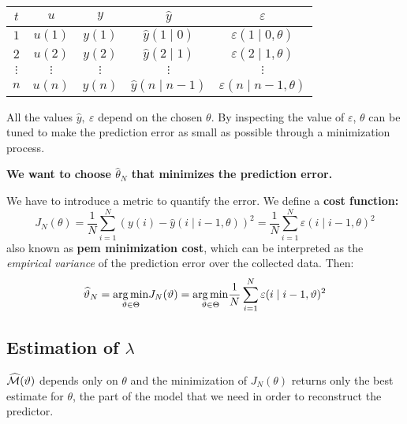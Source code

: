 \begin{center}

\begin{tabular}{ccccc}
\toprule 
 $t$ & $u$ & $y$ & $ \hat{y}$ & $ \varepsilon $ \\
\midrule 
 $1$ & $ u(1)$ & $ y(1)$ & $ \hat{y}(1\mid 0)$ & $ \varepsilon (1\mid 0,\theta)$ \\
$2$ & $ u(2)$ & $ y(2)$ & $ \hat{y}(2\mid 1)$ & $ \varepsilon (2\mid 1,\theta)$ \\
$ \vdots $ & $ \vdots $ & $ \vdots $ & $ \vdots $ & $ \vdots $ \\
$n$ & $ u(n)$ & $ y(n)$ & $ \hat{y}(n\mid n-1)$ & $ \varepsilon (n\mid n-1,\theta)$ \\
 \bottomrule
\end{tabular}
\end{center}

All the values $ \hat{y} ,\ \varepsilon $ depend on the chosen $ \theta $. By inspecting the value of $ \varepsilon $, $ \theta $ can be tuned to make the prediction error as small as possible through a minimization process.

\textbf{We want to choose $\hat{\theta}_{N}$ that minimizes the prediction error.}

We have to introduce a metric to quantify the error. We define a \textbf{cost function:} 
\begin{equation*}
	\boxed{J_{N}(\theta) =\frac{1}{N}\sum _{i=1}^{N}(y(i) -\hat{y}(i\mid i-1,\theta))^{2} =\frac{1}{N}\sum _{i=1}^{N} \varepsilon (i\mid i-1,\theta)^{2}}
\end{equation*}
also known as \textbf{\gls{pem} minimization cost}, which can be interpreted as the \emph{empirical variance} of the prediction error over the collected data. Then:
\begin{equation*}
\widehat{\vartheta }_{N} =\underset{\vartheta \in \Theta}{\operatorname*{arg\,min}} J_{N}(\vartheta) =\underset{\vartheta \in \Theta}{\operatorname*{arg\,min}}\frac{1}{N}\sum _{i=1}^{N} \varepsilon (i\mid i-1,\vartheta)^{2}
\end{equation*}

\subsection{Estimation of \texorpdfstring{$\lambda$}{lambda}}

$ \widehat{\mathcal{M}}(\vartheta)$ depends only on $ \theta $ and the minimization of $J_{N}(\theta)$ returns only the best estimate for $\theta$, the part of the model that we need in order to reconstruct the predictor.

